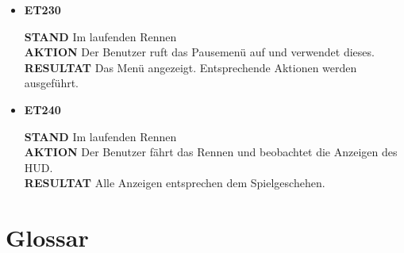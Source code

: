 \documentclass[parskip=full]{scrartcl}
\begin{document}
\begin{itemize} [label={}]
		\item \textbf{ET230}\par
			\textbf{STAND} Im laufenden Rennen\\ 
			\textbf{AKTION} Der Benutzer ruft das Pausemenü auf und verwendet dieses.\\
			\textbf{RESULTAT} Das Menü angezeigt. Entsprechende Aktionen werden ausgeführt.\\\par
			
		\item \textbf{ET240}\par
			\textbf{STAND} Im laufenden Rennen\\ 
			\textbf{AKTION} Der Benutzer fährt das Rennen und beobachtet die Anzeigen des HUD.\\
			\textbf{RESULTAT} Alle Anzeigen entsprechen dem Spielgeschehen.\\\par
	
		\end{itemize}

	
	\pagebreak
	
	\section{Glossar}
	\printnoidxglossaries
	
\end{document}
